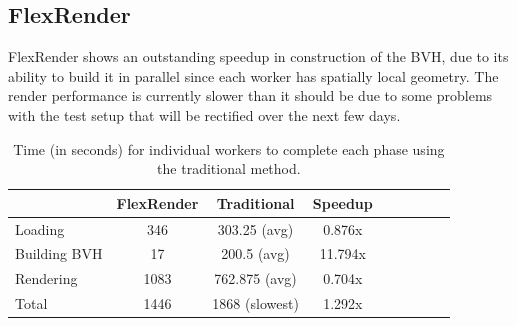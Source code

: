 \documentclass[12pt]{ucthesis}
\begin{document}
\subsection{FlexRender}
\label{toystoreflexrender}

FlexRender shows an outstanding speedup in construction of the BVH, due to its
ability to build it in parallel since each worker has spatially local geometry.
The render performance is currently slower than it should be due to
some problems with the test setup that will be rectified over the next few
days.

\begin{table}
\begin{center}
\begin{tabular}{|l||c|c|c|c|c|c|c|c|}
    \hline
    & FlexRender & Traditional & Speedup \\
    \hline
    \hline
    Loading & 346 & 303.25 (avg) & 0.876x \\
    \hline
    Building BVH & 17 & 200.5 (avg) & 11.794x \\
    \hline
    Rendering & 1083 & 762.875 (avg) & 0.704x \\
    \hline
    \hline
    Total & 1446 & 1868 (slowest) & 1.292x \\
    \hline
\end{tabular}
\caption{Time (in seconds) for individual workers to complete each phase using the traditional method.}
\label{tb:traditionaltimes}
\end{center}
\end{table}
\end{document}
